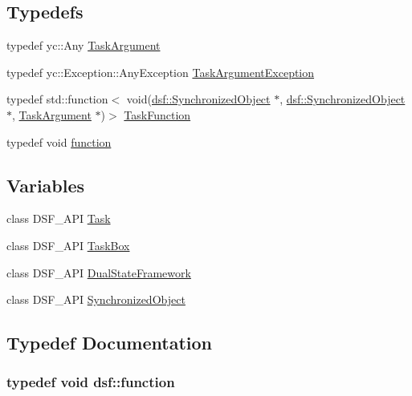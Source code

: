 \subsection*{Typedefs}
\begin{DoxyCompactItemize}
\item 
typedef yc\+::\+Any \hyperlink{namespacedsf_abe4bf68433935a81c31a5ada9b17663a}{Task\+Argument}
\item 
typedef yc\+::\+Exception\+::\+Any\+Exception \hyperlink{namespacedsf_af54027177bbfc0037be408a612d48b83}{Task\+Argument\+Exception}
\item 
typedef std\+::function$<$ void(\hyperlink{classdsf_1_1_synchronized_object}{dsf\+::\+Synchronized\+Object} $\ast$, \hyperlink{classdsf_1_1_synchronized_object}{dsf\+::\+Synchronized\+Object} $\ast$, \hyperlink{namespacedsf_abe4bf68433935a81c31a5ada9b17663a}{Task\+Argument} $\ast$)$>$ \hyperlink{namespacedsf_aa16e735f29587f4485b56fc46746f7a9}{Task\+Function}
\item 
typedef void \hyperlink{namespacedsf_a3ad20407a44eaf5ce4cf784a60c1b92b}{function}
\end{DoxyCompactItemize}
\subsection*{Variables}
\begin{DoxyCompactItemize}
\item 
class D\+S\+F\+\_\+\+A\+P\+I \hyperlink{namespacedsf_a7df24c7d3d82e2e686aa3a524dc1dee9}{Task}
\item 
class D\+S\+F\+\_\+\+A\+P\+I \hyperlink{namespacedsf_ac3c92e2a98380dd728b0c18d0c495966}{Task\+Box}
\item 
class D\+S\+F\+\_\+\+A\+P\+I \hyperlink{namespacedsf_a68ac3b6a0526bfa7f6a412918afb1841}{Dual\+State\+Framework}
\item 
class D\+S\+F\+\_\+\+A\+P\+I \hyperlink{namespacedsf_acbf1798fc56cfb1707162a17e13f5fda}{Synchronized\+Object}
\end{DoxyCompactItemize}


\subsection{Typedef Documentation}
\hypertarget{namespacedsf_a3ad20407a44eaf5ce4cf784a60c1b92b}{}
\subsubsection[{function}]{\setlength{\rightskip}{0pt plus 5cm}typedef void {\bf dsf\+::function}}\label{namespacedsf_a3ad20407a44eaf5ce4cf784a60c1b92b}
\hypertarget{namespacedsf_abe4bf68433935a81c31a5ada9b17663a}{}
